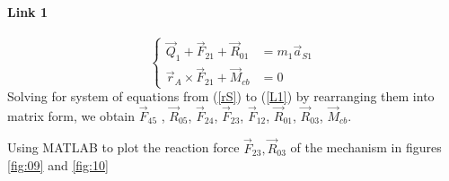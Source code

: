 \paragraph{Link 1}
\begin{equation}\label{L1}
\left\{
\begin{array}{cl}
\vec{Q}_{1}+\vec{F}_{21}+\vec{R}_{01}&=m_1\vec{a}_{S1}\\
\vec{r}_A\times \vec{F}_{21}+\vec{M}_{cb}&=0
\end{array} 
\right.
\end{equation}
Solving for system of equations from (\ref{rS}) to (\ref{L1}) by rearranging them into matrix form, we obtain $ \vec{F}_{45}$ , $ \vec{R}_{05}$, $\vec{F}_{24}$, $\vec{F}_{23}$, $\vec{F}_{12}$, $\vec{R}_{01}$, $\vec{R}_{03}$, $\vec{M}_{cb} $.

Using MATLAB\textup{\textregistered} to plot the reaction force $ \vec{F}_{23},\vec{R}_{03} $ of the mechanism in figures \ref{fig:09} and \ref{fig:10}

